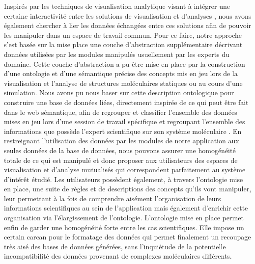 Inspirés par les techniques de visualisation analytique visant à intégrer une certaine interactivité entre les solutions de visualisation et d'analyses \cite{kielman2009foundations}, nous avons également chercher à lier les données échangées entre ces solutions afin de pouvoir les manipuler dans un espace de travail commun.
Pour ce faire, notre approche s'est basée sur la mise place une couche d'abstraction supplémentaire décrivant données utilisées par les modules manipulés usuellement par les experts du domaine. Cette couche d'abstraction a pu être mise en place par la construction d'une ontologie et d'une sémantique précise des concepts mis en jeu lors de la visualisation et l'analyse de structures moléculaires statiques ou au cours d'une simulation. Nous avons pu nous baser sur cette description ontologique pour construire une base de données liées, directement inspirée de ce qui peut être fait dans le web sémantique, afin de regrouper et classifier l'ensemble des données mises en jeu lors d'une session de travail spécifique et regroupant l'ensemble des informations que possède l'expert scientifique sur son système moléculaire \cite{berners2001semantic}. En restreignant l'utilisation des données par les modules de notre application aux seules données de la base de données, nous pouvons assurer une homogénéité totale de ce qui est manipulé et donc proposer aux utilisateurs des espaces de visualisation et d'analyse mutualisés qui correspondent parfaitement au système d’intérêt étudié. Les utilisateurs possèdent également, à travers l'ontologie mise en place, une suite de règles et de descriptions des concepts qu'ils vont manipuler, leur permettant à la fois de comprendre aisément l'organisation de leurs informations scientifiques au sein de l'application mais également d'enrichir cette organisation via l'élargissement de l'ontologie. L'ontologie mise en place permet enfin de garder une homogénéité forte entre les cas scientifiques. Elle impose un certain carcan pour le formatage des données qui permet finalement un recoupage très aisé des bases de données générées, sans l'inquiétude de la potentielle incompatibilité des données provenant de complexes moléculaires différents.




